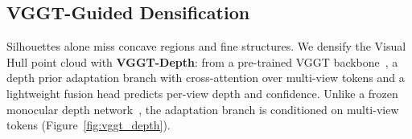 \subsection{VGGT-Guided Densification}

\label{sec:depth_densify}

Silhouettes alone miss concave regions and fine structures. We densify the Visual Hull point cloud with \textbf{VGGT-Depth}: from a pre-trained VGGT backbone~\cite{Wang25_VGGT}, a depth prior adaptation branch with cross-attention over multi-view tokens and a lightweight fusion head predicts per-view depth and confidence. Unlike a frozen monocular depth network~\cite{Yang24_DepthAnythingV2}, the adaptation branch is conditioned on multi-view tokens (Figure~\ref{fig:vggt_depth}).

